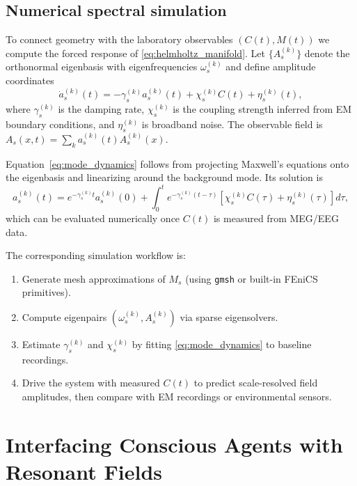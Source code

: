 \documentclass[12pt,a4paper]{article}
\theoremstyle{definition}
\begin{document}
\subsection{Numerical spectral simulation}

To connect geometry with the laboratory observables $(C(t), M(t))$ we compute the forced response of \eqref{eq:helmholtz_manifold}. Let $\{A_s^{(k)}\}$ denote the orthonormal eigenbasis with eigenfrequencies $\omega_s^{(k)}$ and define amplitude coordinates
\begin{equation}
\label{eq:mode_dynamics}
\dot{a}_s^{(k)}(t) = -\gamma_s^{(k)} a_s^{(k)}(t) + \chi_s^{(k)} C(t) + \eta_s^{(k)}(t),
\end{equation}
where $\gamma_s^{(k)}$ is the damping rate, $\chi_s^{(k)}$ is the coupling strength inferred from EM boundary conditions, and $\eta_s^{(k)}$ is broadband noise. The observable field is $A_s(x,t) = \sum_k a_s^{(k)}(t) A_s^{(k)}(x)$.

Equation~\eqref{eq:mode_dynamics} follows from projecting Maxwell's equations onto the eigenbasis and linearizing around the background mode. Its solution is
\begin{equation}
a_s^{(k)}(t) = e^{-\gamma_s^{(k)} t} a_s^{(k)}(0) + \int_0^{t} e^{-\gamma_s^{(k)} (t - \tau)} \left[\chi_s^{(k)} C(\tau) + \eta_s^{(k)}(\tau) \right] d\tau,
\end{equation}
which can be evaluated numerically once $C(t)$ is measured from MEG/EEG data.

The corresponding simulation workflow is:
\begin{enumerate}
    \item Generate mesh approximations of $M_s$ (using \texttt{gmsh}\cite{Geuzaine2009} or built-in FEniCS primitives\cite{Logg2012}).
    \item Compute eigenpairs $(\omega_s^{(k)}, A_s^{(k)})$ via sparse eigensolvers.
    \item Estimate $\gamma_s^{(k)}$ and $\chi_s^{(k)}$ by fitting \eqref{eq:mode_dynamics} to baseline recordings.
    \item Drive the system with measured $C(t)$ to predict scale-resolved field amplitudes, then compare with EM recordings or environmental sensors.
\end{enumerate}

\section{Interfacing Conscious Agents with Resonant Fields}
\end{document}
